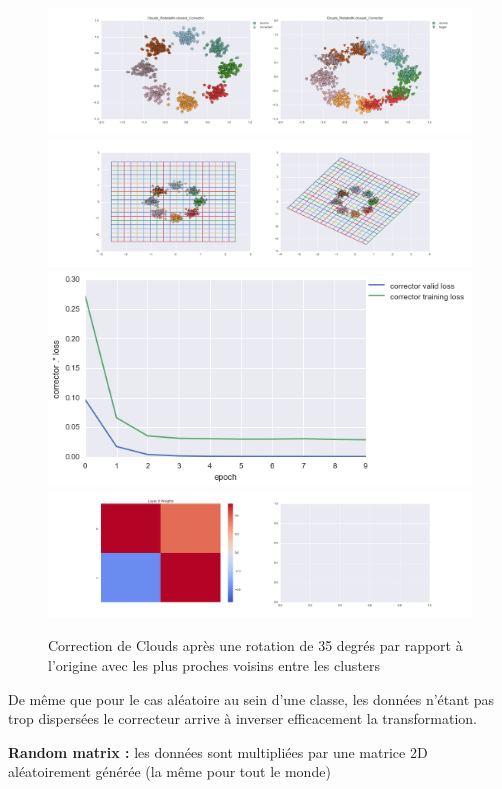 \begin{figure}[H] %
\centering
\includegraphics[width=\linewidth]{fig/24-05-2016/clouds/Clouds_RotatedK-closest_Corrector-DATA.png}
\includegraphics[width=\linewidth]{fig/24-05-2016/clouds/Clouds_RotatedK-closest_Corrector-GridCheck.png}
\includegraphics[width=0.45\linewidth]{fig/24-05-2016/clouds/Clouds_RotatedK-closest_Corrector-Learning_curve.png}
\includegraphics[width=\linewidth]{fig/24-05-2016/clouds/Clouds_RotatedK-closest_Corrector-W.png}
\caption{Correction de Clouds après une rotation de 35 degrés par rapport à l'origine avec les plus proches voisins entre les clusters}
\label{fig:recap-clouds-rot-exhaustive}
\end{figure}

De même que pour le cas aléatoire au sein d'une classe, les données n'étant pas trop dispersées 
le correcteur arrive à inverser efficacement la transformation.

{\Large \textbf{Random matrix :}} les données sont multipliées par une matrice 2D aléatoirement générée
 (la même pour tout le monde)

